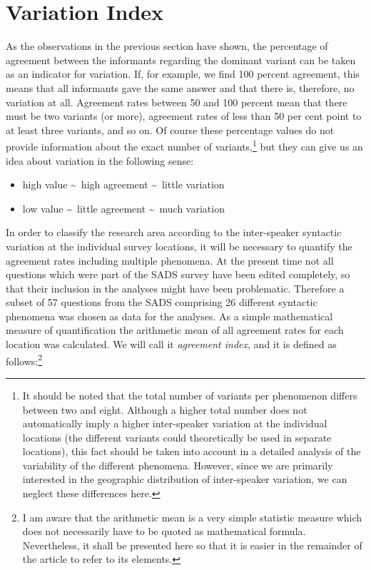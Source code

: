 \documentclass[output=paper]{LSP/langsci}
\begin{document}
\section{Variation Index}

As the observations in the previous section have shown, the percentage of agreement between the informants regarding the dominant variant can be taken as an indicator for variation. If, for example, we find 100 percent agreement, this means that all informants gave the same answer and that there is, therefore, no variation at all. Agreement rates between 50 and 100 percent mean that there must be two variants (or more), agreement rates of less than 50 per cent point to at least three variants, and so on. Of course these percentage values do not provide information about the exact number of variants,\footnote{ It should be noted that the total number of variants per phenomenon differs between two and eight. Although a higher total number does not automatically imply a higher inter-speaker variation at the individual locations (the different variants could theoretically be used in separate locations), this fact should be taken into account in a detailed analysis of the variability of the different phenomena. However, since we are primarily interested in the geographic distribution of inter-speaker variation, we can neglect these differences here.} but they can give us an idea about variation in the following sense:

\begin{itemize}
\item high value \textasciitilde ~high agreement \textasciitilde ~little variation
\item low value \textasciitilde ~little agreement \textasciitilde ~much variation
\end{itemize}

In order to classify the research area according to the inter-speaker syntactic variation at the individual survey locations, it will be necessary to quantify the agreement rates including multiple phenomena. At the present time not all questions which were part of the SADS survey have been edited completely, so that their inclusion in the analyses might have been problematic. Therefore a subset of 57 questions from the SADS comprising 26 different syntactic phenomena was chosen as data for the analyses. As a simple mathematical measure of quantification the arithmetic mean of all agreement rates for each location was calculated. We will call it \emph{agreement index}, and it is defined as follows:\footnote{I am aware that the arithmetic mean is a very simple statistic measure which does not necessarily have to be quoted as mathematical formula. Nevertheless, it shall be presented here so that it is easier in the remainder of the article to refer to its elements.}
\end{document}
